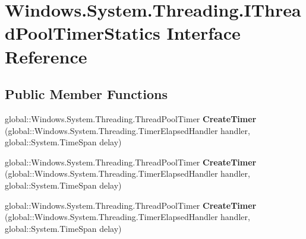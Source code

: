 \hypertarget{interface_windows_1_1_system_1_1_threading_1_1_i_thread_pool_timer_statics}{}\section{Windows.\+System.\+Threading.\+I\+Thread\+Pool\+Timer\+Statics Interface Reference}
\label{interface_windows_1_1_system_1_1_threading_1_1_i_thread_pool_timer_statics}
\subsection*{Public Member Functions}
\begin{DoxyCompactItemize}
\item 
\mbox{\label{interface_windows_1_1_system_1_1_threading_1_1_i_thread_pool_timer_statics_a2ef4b3c10d4a1169d21709cc458143f0}} 
global\+::\+Windows.\+System.\+Threading.\+Thread\+Pool\+Timer {\bfseries Create\+Timer} (global\+::\+Windows.\+System.\+Threading.\+Timer\+Elapsed\+Handler handler, global\+::\+System.\+Time\+Span delay)
\item 
\mbox{\label{interface_windows_1_1_system_1_1_threading_1_1_i_thread_pool_timer_statics_a2ef4b3c10d4a1169d21709cc458143f0}} 
global\+::\+Windows.\+System.\+Threading.\+Thread\+Pool\+Timer {\bfseries Create\+Timer} (global\+::\+Windows.\+System.\+Threading.\+Timer\+Elapsed\+Handler handler, global\+::\+System.\+Time\+Span delay)
\item 
\mbox{\label{interface_windows_1_1_system_1_1_threading_1_1_i_thread_pool_timer_statics_a2ef4b3c10d4a1169d21709cc458143f0}} 
global\+::\+Windows.\+System.\+Threading.\+Thread\+Pool\+Timer {\bfseries Create\+Timer} (global\+::\+Windows.\+System.\+Threading.\+Timer\+Elapsed\+Handler handler, global\+::\+System.\+Time\+Span delay)
\item 
\mbox{\label{interface_windows_1_1_system_1_1_threading_1_1_i_thread_pool_timer_statics_a2ef4b3c10d4a1169d21709cc458143f0}} 

\end{DoxyCompactItemize}
